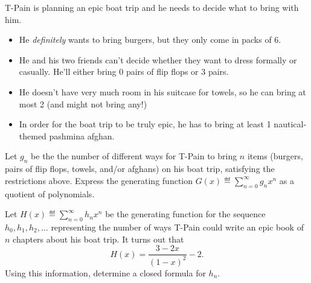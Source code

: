 \documentclass[12pt]{article}
\begin{document}
\begin{problem}{14}

T-Pain is planning an epic boat trip and he needs to decide what to bring with him.

\begin{itemize}

    \item He \emph{definitely} wants to bring burgers, but they only come in packs of 6.

\item He and his two friends can't decide whether they want to dress formally or
casually. He'll either bring 0 pairs of flip flops or 3 pairs.

\item He doesn't have very much room in his suitcase for towels, so he can
  bring at most 2 (and might not bring any!)

\item In order for the boat trip to be truly epic, he has to bring at least 1
nautical-themed pashmina afghan.

\end{itemize}

\bparts

 Let $g_n$ be the the number of different ways for T-Pain to bring
$n$ items (burgers, pairs of flip flops, towels, and/or afghans) on his
boat trip, satisfying the restrictions above.  Express the generating function $G(x) \eqdef
\sum_{n=0}^{\infty} g_nx^n$ as a quotient of polynomials.



 Let $H(x) \eqdef \sum_{n=0}^\infty h_nx^n$ be the generating function for the sequence $h_0, h_1, h_2, \ldots$ representing the number of ways T-Pain could write an epic book of $n$ chapters about his boat trip. It turns out that
\[ H(x) = \frac{3-2x}{(1-x)^2} - 2. \]
Using this information, determine a closed formula for $h_n$.


\end{problem}
\end{document}
